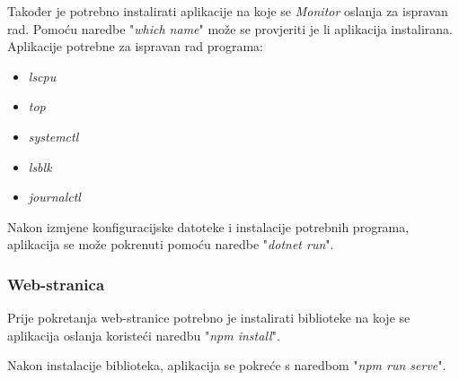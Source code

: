 \documentclass[zavrsnirad]{fer}
\begin{document}
Također je potrebno instalirati aplikacije na koje se \textit{Monitor} oslanja za ispravan rad. Pomoću naredbe "\textit{which {name}}" može se provjeriti je li aplikacija instalirana. Aplikacije potrebne za ispravan rad programa:
\begin{itemize}
	\item  \textit{lscpu}
	\item \textit{top}
	\item \textit{systemctl}
	\item \textit{lsblk}
	\item \textit{journalctl}
\end{itemize}

Nakon izmjene konfiguracijske datoteke i instalacije potrebnih programa, aplikacija se može pokrenuti pomoću naredbe "\textit{dotnet run}".

\subsubsection{Web-stranica}
Prije pokretanja web-stranice potrebno je instalirati biblioteke na koje se aplikacija oslanja koristeći naredbu "\textit{npm install}".

Nakon instalacije biblioteka, aplikacija se pokreće s naredbom "\textit{npm run serve}".
\end{document}
